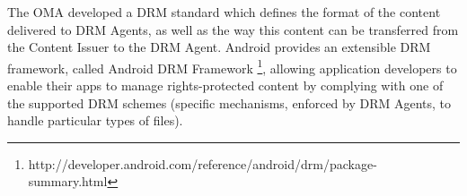 The \ac{OMA} developed a DRM standard \cite{drm} which defines the format of the content delivered to DRM Agents, as well as the way this content can be transferred from the Content Issuer to the DRM Agent. Android provides an extensible DRM framework, called Android DRM Framework \footnote{http://developer.android.com/reference/android/drm/package-summary.html}, allowing application developers to enable their apps to manage rights-protected content by complying with one of the supported DRM schemes (specific mechanisms, enforced by DRM Agents, to handle particular types of files).





